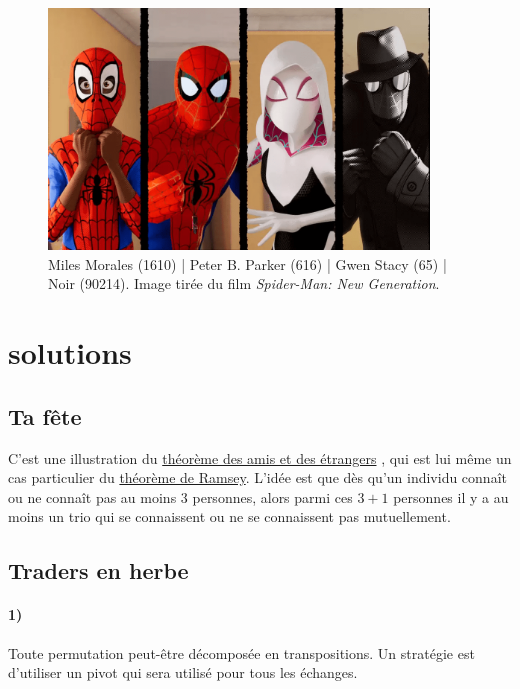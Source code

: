 \documentclass[a4paper,10pt,oneside]{article}
\begin{document}
\vspace{3cm}
\begin{figure}[!ht]
  \centering
  \includegraphics[width=0.9\textwidth]{figures/boites_spider.png}
  \caption*{Miles Morales (1610) | Peter B. Parker (616) | Gwen Stacy (65) | Noir (90214). Image tirée du film \textit{Spider-Man: New Generation}.}
\end{figure}


\section{solutions}

\subsection{Ta fête}

C'est une illustration du 
\href{
  https://fr.wikipedia.org/wiki/Th%
}{théorème des amis et des étrangers}
, qui est lui même un cas particulier du
\href{
  https://fr.wikipedia.org/wiki/Th%
}{théorème de Ramsey}.
L'idée est que dès qu'un individu connaît ou ne connaît pas au moins $3$ personnes, alors parmi ces $3+1$ personnes il y a au moins un trio qui se connaissent ou ne se connaissent pas mutuellement.

\subsection{Traders en herbe}

\paragraph*{1)}
Toute permutation peut-être décomposée en transpositions. 
Un stratégie est d'utiliser un pivot qui sera utilisé pour tous les échanges.
\end{document}
